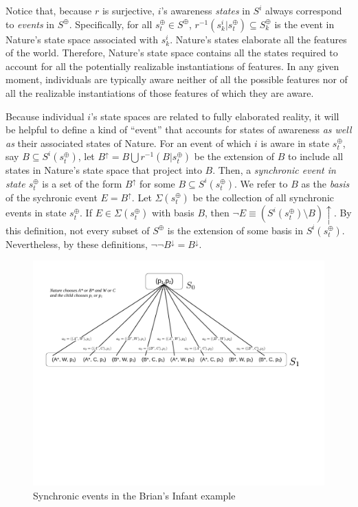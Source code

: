 \documentclass[
11pt,
titlepage,
reqno,
]{article}%
\theoremstyle{definition}
\begin{document}
Notice that, because $r$ is surjective, $i$'s awareness \textit{states} in $S^i$ always correspond to \textit{events} in $S^\oplus$.
Specifically, for all $s^\oplus_t\in S^\oplus$, $r^{-1}(s^i_k|s^\oplus_t)\subseteq S^\oplus_k$ is the event in Nature's state space associated with $s^i_k$.
Nature's states elaborate all the features of the world.
Therefore, Nature's state space contains all the states required to account for all the potentially realizable instantiations of features.
In any given moment, individuals are typically aware neither of all the possible features nor of all the realizable instantiations of those features of which they are aware. 
	
	
	
Because individual $i$'s state spaces are related to fully elaborated reality, it will be helpful to define a kind of ``event'' that  accounts for states of awareness \textit{as well as} their associated states of Nature.
For an event of which $i$ is aware in state $s^\oplus_t$, say $B\subseteq S^i(s^\oplus_t)$, let $B^{\uparrow}=B\bigcup r^{-1}(B|s^\oplus_t)$ be the extension of $B$ to include all states in Nature's state space that project into $B$.
Then, a \textit{synchronic event in state $s^\oplus_t$} is a set of the form $B^{\uparrow}$ for some $B\subseteq S^i(s^\oplus_t)$.
We refer to  $B$ as the \textit{basis} of the sychronic event $E=B^{\uparrow}$.
Let $\Sigma(s^\oplus_t)$ be the collection of all synchronic events in state $s^\oplus_t$.
If $E\in \Sigma(s^\oplus_t)$ with basis $B$, then $\neg E\equiv(S^i(s^\oplus_t)\setminus B)\uparrow$. 
By this definition, not every subset of $S^\oplus$ is the extension of some basis in $S^i(s^\oplus_t)$.
Nevertheless, by these definitions,  $\lnot\lnot B^\downarrow = B^\downarrow$.
	
	
\begin{figure}[h!]
	\centering
	\includegraphics*[page=4,trim = 0in 3.5in 1.5in 0in,scale=.7]{Awareness_Diagrams_All}
	\caption{Synchronic events in the Brian's Infant example\label{old1}}%
\end{figure}
	
\end{document}
